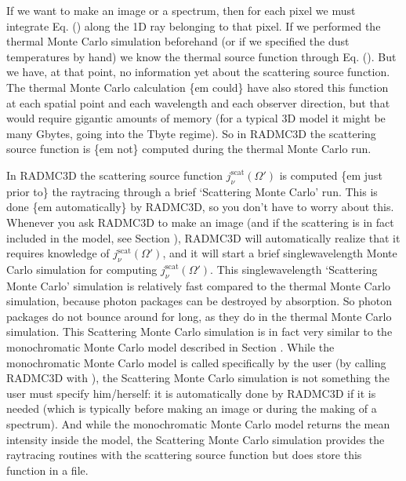 \documentclass[letterpaper,10pt,english]{sphinxmanual}
\begin{document}
If we want to make an image or a spectrum, then for each pixel we must integrate
Eq. () along the 1\sphinxhyphen{}D ray belonging to that pixel. If we
performed the thermal Monte Carlo simulation beforehand (or if we specified the
dust temperatures by hand) we know the thermal source function through
Eq. (). But we have, at that point, no
information yet about the scattering source function. The thermal Monte Carlo
calculation \{em could\} have also stored this function at each spatial point and
each wavelength and each observer direction, but that would require gigantic
amounts of memory (for a typical 3\sphinxhyphen{}D model it might be many Gbytes, going into
the Tbyte regime). So in RADMC\sphinxhyphen{}3D the scattering source function is \{em not\}
computed during the thermal Monte Carlo run.

In RADMC\sphinxhyphen{}3D the scattering source function \(j_\nu^{\mathrm{scat}}(\Omega')\)
is computed \{em just prior to\} the ray\sphinxhyphen{}tracing through a brief ‘Scattering
Monte Carlo’ run. This is done \{em automatically\} by RADMC\sphinxhyphen{}3D, so you
don’t have to worry about this. Whenever you ask RADMC\sphinxhyphen{}3D to make an image
(and if the scattering is in fact included in the model, see Section
{\hyperref[\detokenize{dustradtrans:sec-modes-of-scattering}]{}}), RADMC\sphinxhyphen{}3D will automatically realize that it
requires knowledge of \(j_\nu^{\mathrm{scat}}(\Omega')\), and it will start a
brief single\sphinxhyphen{}wavelength Monte Carlo simulation for computing
\(j_\nu^{\mathrm{scat}}(\Omega')\). This single\sphinxhyphen{}wavelength ‘Scattering Monte
Carlo’ simulation is relatively fast compared to the thermal Monte Carlo
simulation, because photon packages can be destroyed by absorption. So
photon packages do not bounce around for long, as they do in the thermal
Monte Carlo simulation.  This Scattering Monte Carlo simulation is in fact
very similar to the monochromatic Monte Carlo model described in Section
{\hyperref[\detokenize{dustradtrans:sec-dust-monochromatic-monte-carlo}]{}}. While the monochromatic Monte
Carlo model is called specifically by the user (by calling RADMC\sphinxhyphen{}3D with
), the Scattering Monte Carlo simulation is not
something the user must specify him/her\sphinxhyphen{}self: it is automatically done by
RADMC\sphinxhyphen{}3D if it is needed (which is typically before making an image or
during the making of a spectrum). And while the monochromatic Monte Carlo
model returns the mean intensity inside the model, the Scattering Monte Carlo
simulation provides the raytracing routines with the scattering source
function but does  store this function in a file.
\end{document}
